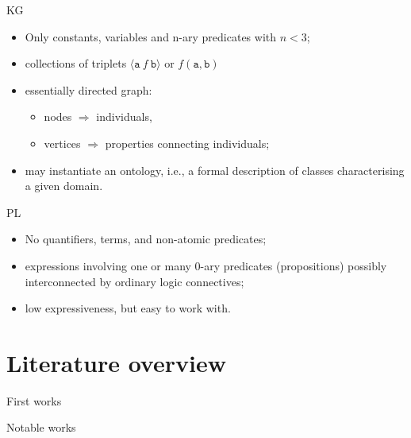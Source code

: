 \documentclass[presentation]{beamer}\mode<presentation>{\usetheme{AMSBolognaFC}}
\newcommand{\functor}[1]{\mathtt{#1}}
\newcommand{\predication}[1]{\mathit{#1}}
\begin{document}
\begin{frame}[c]{KG}
    \begin{itemize}
        \item Only constants, variables and n-ary predicates with $n < 3$;
        \item collections of triplets $\langle \functor{a}\ \predication{f}\ \functor{b} \rangle$ or $\predication{f}(\functor{a}, \functor{b})$
        \item essentially directed graph:
        \begin{itemize}
            \item nodes $\Rightarrow$ individuals,
            \item vertices $\Rightarrow$ properties connecting individuals;
        \end{itemize}
        \item may instantiate an ontology, i.e., a formal description of classes characterising a given domain.
    \end{itemize}
    
\end{frame}

\begin{frame}[c]{PL}
    \begin{itemize}
        \item No quantifiers, terms, and non-atomic predicates;
        \item expressions involving one or many 0-ary predicates (propositions) possibly interconnected by ordinary logic connectives;
        \item low expressiveness, but easy to work with.
    \end{itemize}
\end{frame}


\section{Literature overview}

\begin{frame}[c]{First works}
\end{frame}


\begin{frame}[c]{Notable works}
\end{frame}
\end{document}
